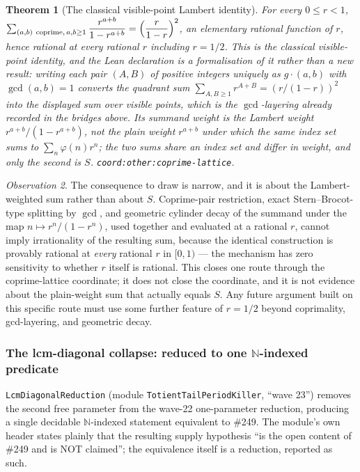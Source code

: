 \documentclass[11pt]{article}
\theoremstyle{plain}
\newtheorem{thm}{Theorem}[section]
\theoremstyle{definition}
\theoremstyle{remark}
\newtheorem{obs}[thm]{Observation}
\newcommand{\lean}[2]{\leanlink{#2}}
\let\origmathrm\mathrm
\renewcommand{\mathrm}[1]{\ifmmode\origmathrm{#1}\else\textrm{#1}\fi}%
\newcommand{\ev}[1]{{\small\textsf{[#1]}}\xspace}
\newcommand{\scale}[1]{{\small\textsf{scale:#1}}\xspace}
\newcommand{\coord}[1]{\texorpdfstring{{\small\nolinkurl{coord:#1}}}{coord:#1}\xspace}
\begin{document}
\begin{thm}[The classical visible-point Lambert identity]
For every $0\le r<1$, $\sum_{(a,b)\ \mathrm{coprime},\, a,b\ge 1}
\dfrac{r^{a+b}}{1-r^{a+b}} = \Bigl(\dfrac{r}{1-r}\Bigr)^2$, an elementary
rational function of $r$, hence rational at every rational $r$ including
$r=1/2$. This is the classical visible-point identity, and the Lean
declaration is a formalisation of it rather than a new result: writing each
pair $(A,B)$ of positive integers uniquely as $g\cdot(a,b)$ with
$\gcd(a,b)=1$ converts the quadrant sum $\sum_{A,B\ge1}r^{A+B}=(r/(1-r))^2$
into the displayed sum over visible points, which is the $\gcd$-layering
already recorded in the bridges above. Its summand weight is the Lambert
weight $r^{a+b}/(1-r^{a+b})$, not the plain weight $r^{a+b}$ under which the
same index set sums to $\sum_n\varphi(n)r^n$; the two sums share an index set
and differ in weight, and only the second is $S$.
\lean{GeometricCoprimality.tsum_pos_coprime_lambert_eq_sq}{GeometricCoprimality.lean:407}
\quad \ev{Lean} \quad \scale{uniform} \quad \coord{other:coprime-lattice}.
\end{thm}

\begin{obs}
The consequence to draw is narrow, and it is about the Lambert-weighted sum
rather than about $S$. Coprime-pair restriction, exact Stern--Brocot-type
splitting by $\gcd$, and geometric cylinder decay of the summand under the
map $n\mapsto r^n/(1-r^n)$, used together and evaluated at a rational $r$,
cannot imply irrationality of the resulting sum, because the identical
construction is provably rational at \emph{every} rational $r$ in $[0,1)$ ---
the mechanism has zero sensitivity to whether $r$ itself is rational. This
closes one route through the coprime-lattice coordinate; it does not close
the coordinate, and it is not evidence about the plain-weight sum that
actually equals $S$. Any future argument built on this specific route must
use some further feature of $r=1/2$ beyond coprimality, gcd-layering, and
geometric decay.
\end{obs}

\subsubsection{The lcm-diagonal collapse: reduced to one \texorpdfstring{$\mathbb{N}$}{N}-indexed predicate}

\texttt{LcmDiagonalReduction} (module \texttt{TotientTailPeriodKiller},
``wave 23'') removes the second free parameter from the wave-22
one-parameter reduction, producing a single decidable $\mathbb{N}$-indexed
statement equivalent to \#249. The module's own header states plainly that
the resulting supply hypothesis ``is the open content of \#249 and is NOT
claimed''; the equivalence itself is a reduction, reported as such.
\end{document}
